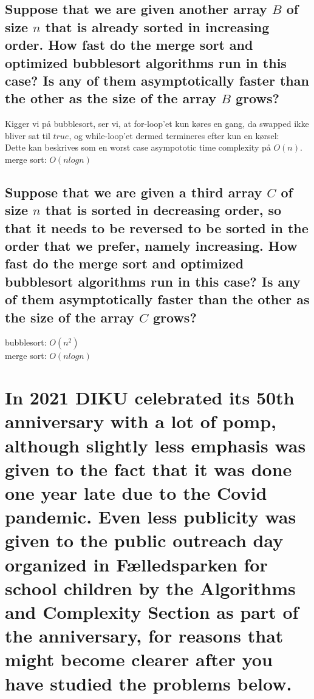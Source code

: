 \documentclass[a4paper,12pt]{article}
\begin{document}
\subsection[]{Suppose that we are given another array $B$ of size $n$ that is already sorted in increasing order. How fast do the merge sort and optimized bubblesort algorithms run in this case? Is any of them asymptotically faster than the other as the size of the array $B$ grows?}

Kigger vi på bubblesort, ser vi, at for-loop'et kun køres en gang, da swapped ikke bliver sat til $true$, og while-loop'et dermed termineres efter kun en kørsel:\\
Dette kan beskrives som en worst case asympototic time complexity på $O(n)$.\\

merge sort: $O(n log n)$\\

\subsection[]{Suppose that we are given a third array $C$ of size $n$ that is sorted in decreasing order, so that it needs to be reversed to be sorted in the order that we prefer, namely increasing. How fast do the merge sort and optimized bubblesort algorithms run in this case? Is any of them asymptotically faster than the other as the size of the array $C$ grows?}

bubblesort: $O(n^2)$\\
merge sort: $O(n log n)$\\

\section[Question 2]{In 2021 DIKU celebrated its 50th anniversary with a lot of pomp, although slightly less emphasis was given to the fact that it was done one year late due to the Covid pandemic. Even less publicity was given to the public outreach day organized in F\ae lledsparken for school children by the Algorithms and Complexity Section as part of the anniversary, for reasons that might become clearer after you have studied the problems below.}
\end{document}
